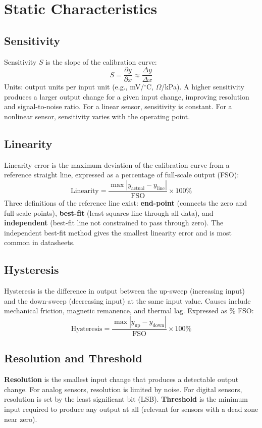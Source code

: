 \documentclass[11pt,letterpaper,twoside,openany]{book}
\newcommand{\degC}{\ensuremath{{}^{\circ}\text{C}}}
\begin{document}
\section{Static Characteristics}

\subsection{Sensitivity}
Sensitivity $S$ is the slope of the calibration curve:
\begin{equation}
S = \frac{\partial y}{\partial x} \approx \frac{\Delta y}{\Delta x}
\end{equation}
Units: output units per input unit (e.g., mV/\degC{}, $\Omega$/kPa). A higher sensitivity produces a larger output change for a given input change, improving resolution and signal-to-noise ratio. For a linear sensor, sensitivity is constant. For a nonlinear sensor, sensitivity varies with the operating point.

\subsection{Linearity}
Linearity error is the maximum deviation of the calibration curve from a reference straight line, expressed as a percentage of full-scale output (FSO):
\begin{equation}
\text{Linearity} = \frac{\max |y_{\text{actual}} - y_{\text{line}}|}{\text{FSO}} \times 100\%
\end{equation}
Three definitions of the reference line exist: \textbf{end-point} (connects the zero and full-scale points), \textbf{best-fit} (least-squares line through all data), and \textbf{independent} (best-fit line not constrained to pass through zero). The independent best-fit method gives the smallest linearity error and is most common in datasheets.

\subsection{Hysteresis}
Hysteresis is the difference in output between the up-sweep (increasing input) and the down-sweep (decreasing input) at the same input value. Causes include mechanical friction, magnetic remanence, and thermal lag. Expressed as \% FSO:
\begin{equation}
\text{Hysteresis} = \frac{\max |y_{\text{up}} - y_{\text{down}}|}{\text{FSO}} \times 100\%
\end{equation}

\subsection{Resolution and Threshold}
\textbf{Resolution} is the smallest input change that produces a detectable output change. For analog sensors, resolution is limited by noise. For digital sensors, resolution is set by the least significant bit (LSB). \textbf{Threshold} is the minimum input required to produce any output at all (relevant for sensors with a dead zone near zero).
\end{document}
